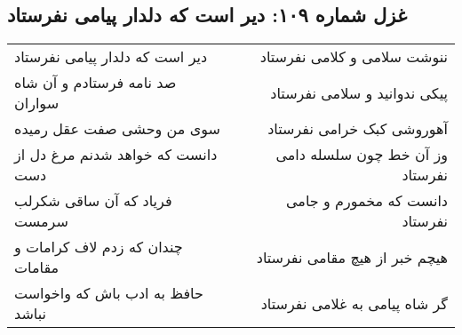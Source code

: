 \begin{center}
\section*{غزل شماره ۱۰۹: دیر است که دلدار پیامی نفرستاد}
\label{sec:sh109}
\begin{longtable}{l p{0.5cm} r}
دیر است که دلدار پیامی نفرستاد
&&
ننوشت سلامی و کلامی نفرستاد
\\
صد نامه فرستادم و آن شاه سواران
&&
پیکی ندوانید و سلامی نفرستاد
\\
سوی من وحشی صفت عقل رمیده
&&
آهوروشی کبک خرامی نفرستاد
\\
دانست که خواهد شدنم مرغ دل از دست
&&
وز آن خط چون سلسله دامی نفرستاد
\\
فریاد که آن ساقی شکرلب سرمست
&&
دانست که مخمورم و جامی نفرستاد
\\
چندان که زدم لاف کرامات و مقامات
&&
هیچم خبر از هیچ مقامی نفرستاد
\\
حافظ به ادب باش که واخواست نباشد
&&
گر شاه پیامی به غلامی نفرستاد
\\
\end{longtable}
\end{center}
